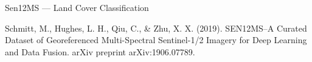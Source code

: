 \documentclass[11pt]{beamer}
\newcommand{\citeapa}[1]{ {\tiny#1\par} }
\begin{document}
	\begin{frame}{Sen12MS ---  Land Cover Classification}
		
		\citeapa{Schmitt, M., Hughes, L. H., Qiu, C., \& Zhu, X. X. (2019). SEN12MS--A Curated Dataset of Georeferenced Multi-Spectral Sentinel-1/2 Imagery for Deep Learning and Data Fusion. arXiv preprint arXiv:1906.07789.}
	\end{frame}
\end{document}
